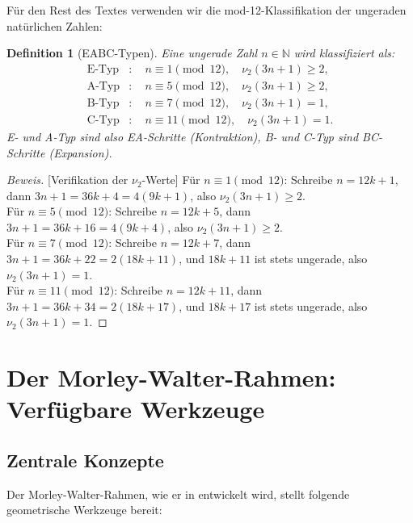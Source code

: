 \documentclass[12pt,a4paper]{article}
\newtheorem{definition}{Definition}[section]
\newenvironment{beweis}{\begin{proof}[Beweis]}{\end{proof}}
\newcommand{\vii}{\nu_2}
\newcommand{\N}{\mathbb{N}}
\begin{document}
Für den Rest des Textes verwenden wir die mod-12-Klassifikation
der ungeraden natürlichen Zahlen:

\begin{definition}[EABC-Typen]
\label{def:eabc}
Eine ungerade Zahl $n \in \N$ wird klassifiziert als:
\begin{align*}
  \text{E-Typ} &:\quad n \equiv 1 \pmod{12},\quad \vii(3n+1) \geq 2,\\
  \text{A-Typ} &:\quad n \equiv 5 \pmod{12},\quad \vii(3n+1) \geq 2,\\
  \text{B-Typ} &:\quad n \equiv 7 \pmod{12},\quad \vii(3n+1) = 1,\\
  \text{C-Typ} &:\quad n \equiv 11 \pmod{12},\quad \vii(3n+1) = 1.
\end{align*}
E- und A-Typ sind also EA-Schritte (Kontraktion), B- und C-Typ sind
BC-Schritte (Expansion).
\end{definition}

\begin{beweis}[Verifikation der $\vii$-Werte]
Für $n \equiv 1 \pmod{12}$: Schreibe $n = 12k+1$, dann
$3n+1 = 36k+4 = 4(9k+1)$, also $\vii(3n+1) \geq 2$. \\
Für $n \equiv 5 \pmod{12}$: Schreibe $n = 12k+5$, dann
$3n+1 = 36k+16 = 4(9k+4)$, also $\vii(3n+1) \geq 2$. \\
Für $n \equiv 7 \pmod{12}$: Schreibe $n = 12k+7$, dann
$3n+1 = 36k+22 = 2(18k+11)$, und $18k+11$ ist stets ungerade,
also $\vii(3n+1) = 1$. \\
Für $n \equiv 11 \pmod{12}$: Schreibe $n = 12k+11$, dann
$3n+1 = 36k+34 = 2(18k+17)$, und $18k+17$ ist stets ungerade,
also $\vii(3n+1) = 1$.
\end{beweis}

\section{Der Morley-Walter-Rahmen: Verfügbare Werkzeuge}

\subsection{Zentrale Konzepte}

Der Morley-Walter-Rahmen, wie er in \cite{morley-walter,bamberg-ptolemy}
entwickelt wird, stellt folgende geometrische Werkzeuge bereit:
\end{document}

